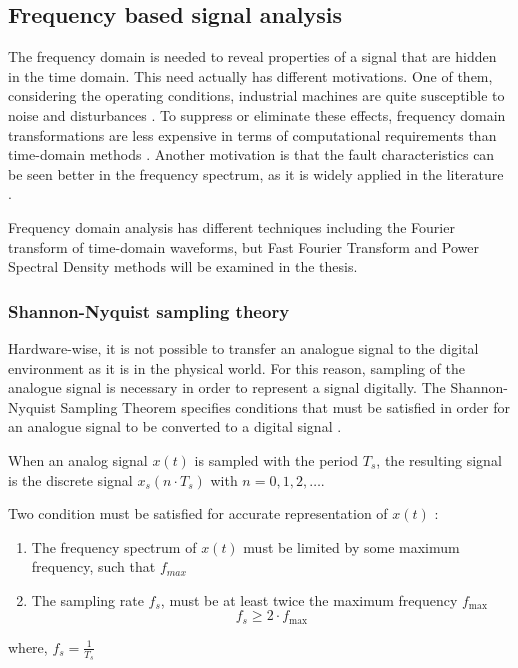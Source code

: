 \subsection{Frequency based signal analysis}

The frequency domain is needed to reveal properties of a signal that are hidden in the time domain. This need actually has different motivations. One of them, considering the operating conditions, industrial machines are quite susceptible to noise and disturbances \cite{cernuda2019relevance,allen2004signal}. To suppress or eliminate these effects, frequency domain transformations are less expensive in terms of computational requirements than time-domain methods \cite{ahmed2019condition,cernuda2019relevance}. Another motivation is that the fault characteristics can be seen better in the frequency spectrum, as it is widely applied in the literature \cite{ahmed2019condition}.

Frequency domain analysis has different techniques including the Fourier transform of time-domain waveforms, but Fast Fourier Transform and Power Spectral Density methods will be examined in the thesis.

\subsubsection{Shannon-Nyquist sampling theory}

Hardware-wise, it is not possible to transfer an analogue signal to the digital environment as it is in the physical world. For this reason, sampling of the analogue signal is necessary in order to represent a signal digitally. The Shannon-Nyquist Sampling Theorem specifies conditions that must be satisfied in order for an analogue signal to be converted to a digital signal \cite{orfanidis1995introduction}. 

When an analog signal $x(t)$ is sampled with the period $T_s$, the resulting signal is the discrete signal $x_s(n\cdot T_s)$ with $n=0,1,2,\ldots$. 

Two condition must be satisfied for accurate representation of $x(t)$ \cite{orfanidis1995introduction}:
\begin{enumerate}
	\item The frequency spectrum of $x(t)$ must be limited by some maximum frequency, such that $f_{max}$ 
	\item The sampling rate $f_{s}$, must be at least twice the maximum frequency $f_{\max }$
	$$
	f_{s} \geq 2\cdot f_{\max }
	$$
\end{enumerate}
where, $f_s = \displaystyle\frac{1}{T_s}$

